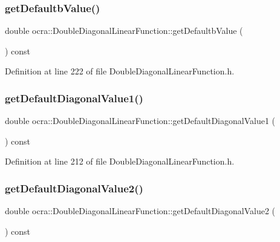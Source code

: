 \subsubsection{\texorpdfstring{get\+Defaultb\+Value()}{getDefaultbValue()}}
{\footnotesize\ttfamily double ocra\+::\+Double\+Diagonal\+Linear\+Function\+::get\+Defaultb\+Value (\begin{DoxyParamCaption}{ }\end{DoxyParamCaption}) const\hspace{0.3cm}{\ttfamily [inline]}}



Definition at line 222 of file Double\+Diagonal\+Linear\+Function.\+h.

\hypertarget{classocra_1_1DoubleDiagonalLinearFunction_a9093eef2a34b3c96b9510794b91279cc}{}\label{classocra_1_1DoubleDiagonalLinearFunction_a9093eef2a34b3c96b9510794b91279cc} 
\subsubsection{\texorpdfstring{get\+Default\+Diagonal\+Value1()}{getDefaultDiagonalValue1()}}
{\footnotesize\ttfamily double ocra\+::\+Double\+Diagonal\+Linear\+Function\+::get\+Default\+Diagonal\+Value1 (\begin{DoxyParamCaption}{ }\end{DoxyParamCaption}) const\hspace{0.3cm}{\ttfamily [inline]}}



Definition at line 212 of file Double\+Diagonal\+Linear\+Function.\+h.

\hypertarget{classocra_1_1DoubleDiagonalLinearFunction_a3593bb0fc409844b8d30e4785565c389}{}\label{classocra_1_1DoubleDiagonalLinearFunction_a3593bb0fc409844b8d30e4785565c389} 
\subsubsection{\texorpdfstring{get\+Default\+Diagonal\+Value2()}{getDefaultDiagonalValue2()}}
{\footnotesize\ttfamily double ocra\+::\+Double\+Diagonal\+Linear\+Function\+::get\+Default\+Diagonal\+Value2 (\begin{DoxyParamCaption}{ }\end{DoxyParamCaption}) const\hspace{0.3cm}{\ttfamily [inline]}}



